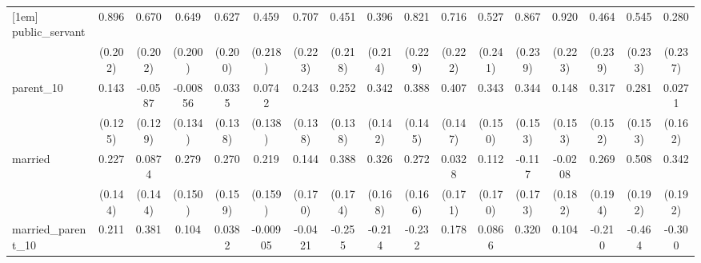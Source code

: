 {\begin{tabular}{l*{16}{c}}
[1em]
public\_servant      &       0.896\sym{***}&       0.670\sym{***}&       0.649\sym{**} &       0.627\sym{**} &       0.459\sym{*}  &       0.707\sym{**} &       0.451\sym{*}  &       0.396         &       0.821\sym{***}&       0.716\sym{**} &       0.527\sym{*}  &       0.867\sym{***}&       0.920\sym{***}&       0.464         &       0.545\sym{*}  &       0.280         \\
                    &     (0.202)         &     (0.202)         &     (0.200)         &     (0.200)         &     (0.218)         &     (0.223)         &     (0.218)         &     (0.214)         &     (0.229)         &     (0.222)         &     (0.241)         &     (0.239)         &     (0.223)         &     (0.239)         &     (0.233)         &     (0.237)         \\
[1em]
parent\_10           &       0.143         &     -0.0587         &    -0.00856         &      0.0335         &      0.0742         &       0.243         &       0.252         &       0.342\sym{*}  &       0.388\sym{**} &       0.407\sym{**} &       0.343\sym{*}  &       0.344\sym{*}  &       0.148         &       0.317\sym{*}  &       0.281         &      0.0271         \\
                    &     (0.125)         &     (0.129)         &     (0.134)         &     (0.138)         &     (0.138)         &     (0.138)         &     (0.138)         &     (0.142)         &     (0.145)         &     (0.147)         &     (0.150)         &     (0.153)         &     (0.153)         &     (0.152)         &     (0.153)         &     (0.162)         \\
[1em]
married             &       0.227         &      0.0874         &       0.279         &       0.270         &       0.219         &       0.144         &       0.388\sym{*}  &       0.326         &       0.272         &      0.0328         &       0.112         &      -0.117         &     -0.0208         &       0.269         &       0.508\sym{**} &       0.342         \\
                    &     (0.144)         &     (0.144)         &     (0.150)         &     (0.159)         &     (0.159)         &     (0.170)         &     (0.174)         &     (0.168)         &     (0.166)         &     (0.171)         &     (0.170)         &     (0.173)         &     (0.182)         &     (0.194)         &     (0.192)         &     (0.192)         \\
[1em]
married\_parent\_10   &       0.211         &       0.381\sym{*}  &       0.104         &      0.0382         &    -0.00905         &     -0.0421         &      -0.255         &      -0.214         &      -0.232         &       0.178         &      0.0866         &       0.320         &       0.104         &      -0.210         &      -0.464         &      -0.300         \\

\end{tabular}}
